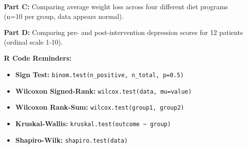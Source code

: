 \documentclass[11pt]{article}
\begin{document}
\vspace{1.5cm}

\textbf{Part C:} Comparing average weight loss across four different diet programs (n=10 per group, data appears normal).

\vspace{1.5cm}

\textbf{Part D:} Comparing pre- and post-intervention depression scores for 12 patients (ordinal scale 1-10).

\vspace{1.5cm}

\vspace{12pt}

\begin{tcolorbox}[colback=blue!5,colframe=blue,boxrule=1pt,arc=0pt]
\textbf{R Code Reminders:}
\begin{itemize}
\item \textbf{Sign Test:} \texttt{binom.test(n\_positive, n\_total, p=0.5)}
\item \textbf{Wilcoxon Signed-Rank:} \texttt{wilcox.test(data, mu=value)}
\item \textbf{Wilcoxon Rank-Sum:} \texttt{wilcox.test(group1, group2)}
\item \textbf{Kruskal-Wallis:} \texttt{kruskal.test(outcome \textasciitilde\ group)}
\item \textbf{Shapiro-Wilk:} \texttt{shapiro.test(data)}
\end{itemize}
\end{tcolorbox}
\end{document}
